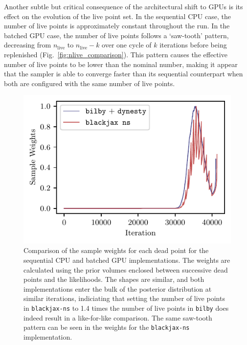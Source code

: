 \documentclass[fleqn,usenatbib]{mnras}
\begin{document}
Another subtle but critical consequence of the architectural shift to GPUs is
its effect on the evolution of the live point set. In the sequential
CPU case, the number of live points is approximately constant throughout the run. In the
batched GPU case, the number of live points follows a `saw-tooth'
pattern, decreasing from $n_{\text{live}}$ to
\mbox{$n_{\text{live}} - k$} over one cycle of $k$ iterations before being replenished (Fig.~\ref{fig:nlive_comparison}). This pattern
causes the effective number of live points to be lower than the nominal number,
making it appear that the sampler is able to converge faster than its sequential counterpart
when both are configured with the same number of live points.

\begin{figure}
    \centering
    \includegraphics{figures/weights_comparison.pdf}
    \caption{Comparison of the sample weights for each dead point for the sequential CPU and batched GPU implementations.
    The weights are calculated using the prior volumes enclosed between successive dead points and the likelihoods. 
    The shapes are similar, and both implementations enter the bulk of the posterior distribution at similar iterations,
    indiciating that setting the number of live points in \texttt{blackjax-ns} to 1.4 times the number of live points in \texttt{bilby} 
    does indeed result in a like-for-like comparison. The same saw-tooth pattern can be 
    seen in the weights for the \texttt{blackjax-ns} implementation.}
    \label{fig:weights_comparison}
\end{figure}
\end{document}
